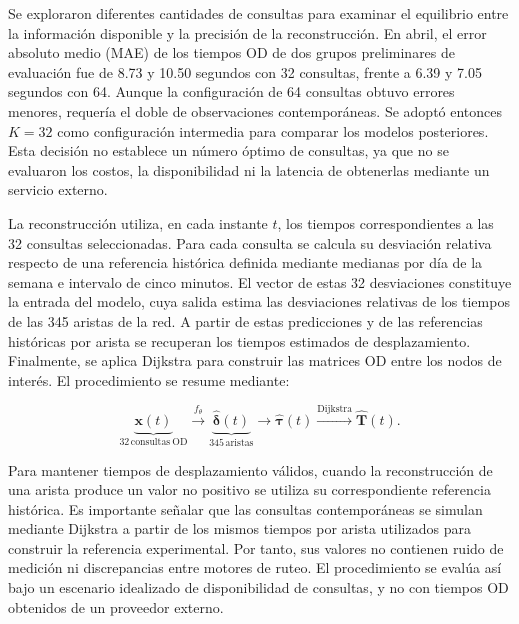 \documentclass[letterpaper,11pt]{article}
\begin{document}
Se exploraron diferentes cantidades de consultas para examinar el equilibrio entre la información disponible y la precisión de la reconstrucción. En abril, el error absoluto medio (MAE) de los tiempos OD de dos grupos preliminares de evaluación fue de 8.73 y 10.50 segundos con 32 consultas, frente a 6.39 y 7.05 segundos con 64. Aunque la configuración de 64 consultas obtuvo errores menores, requería el doble de observaciones contemporáneas. Se adoptó entonces $K=32$ como configuración intermedia para comparar los modelos posteriores. Esta decisión no establece un número óptimo de consultas, ya que no se evaluaron los costos, la disponibilidad ni la latencia de obtenerlas mediante un servicio externo.

La reconstrucción utiliza, en cada instante $t$, los tiempos correspondientes a las 32 consultas seleccionadas. Para cada consulta se calcula su desviación relativa respecto de una referencia histórica definida mediante medianas por día de la semana e intervalo de cinco minutos. El vector de estas 32 desviaciones constituye la entrada del modelo, cuya salida estima las desviaciones relativas de los tiempos de las 345 aristas de la red. A partir de estas predicciones y de las referencias históricas por arista se recuperan los tiempos estimados de desplazamiento. Finalmente, se aplica Dijkstra para construir las matrices OD entre los nodos de interés. El procedimiento se resume mediante:

\begin{equation}
\underbrace{\mathbf{x}(t)}_{32\,\mathrm{consultas\ OD}}
\xrightarrow{\ f_\theta\ }
\underbrace{\widehat{\boldsymbol\delta}(t)}_{345\,\mathrm{aristas}}
\longrightarrow
\widehat{\boldsymbol\tau}(t)
\xrightarrow{\mathrm{Dijkstra}}
\widehat{\mathbf T}(t).
\end{equation}

Para mantener tiempos de desplazamiento válidos, cuando la reconstrucción de una arista produce un valor no positivo se utiliza su correspondiente referencia histórica. Es importante señalar que las consultas contemporáneas se simulan mediante Dijkstra a partir de los mismos tiempos por arista utilizados para construir la referencia experimental. Por tanto, sus valores no contienen ruido de medición ni discrepancias entre motores de ruteo. El procedimiento se evalúa así bajo un escenario idealizado de disponibilidad de consultas, y no con tiempos OD obtenidos de un proveedor externo.
\end{document}
